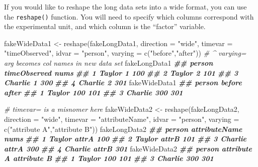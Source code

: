 \documentclass[
  12pt,
  krantz2]{krantz}
\makeatletter
\newenvironment{Shaded}{\begin{snugshade}}{\end{snugshade}}
\newcommand{\AttributeTok}[1]{\textcolor[rgb]{0.61,0.61,0.61}{#1}}
\newcommand{\CommentTok}[1]{\textcolor[rgb]{0.37,0.37,0.37}{\textit{#1}}}
\newcommand{\DocumentationTok}[1]{\textcolor[rgb]{0.37,0.37,0.37}{\textbf{\textit{#1}}}}
\newcommand{\FunctionTok}[1]{\textcolor[rgb]{0,0,0}{#1}}
\newcommand{\NormalTok}[1]{#1}
\newcommand{\OtherTok}[1]{\textcolor[rgb]{0.37,0.37,0.37}{#1}}
\newcommand{\StringTok}[1]{\textcolor[rgb]{0.5,0.5,0.5}{#1}}
\newenvironment{kframe}{%
\medskip{}
\setlength{\fboxsep}{.8em}
 \def\at@end@of@kframe{}%
 \ifinner\ifhmode%
  \def\at@end@of@kframe{\end{minipage}}%
  \begin{minipage}{\columnwidth}%
 \fi\fi%
 \def\FrameCommand##1{\hskip\@totalleftmargin \hskip-\fboxsep
 \colorbox{shadecolor}{##1}\hskip-\fboxsep
     \hskip-\linewidth \hskip-\@totalleftmargin \hskip\columnwidth}%
 \MakeFramed {\advance\hsize-\width
   \@totalleftmargin\z@ \linewidth\hsize
   \@setminipage}}%
 {\par\unskip\endMakeFramed%
 \at@end@of@kframe}
\renewenvironment{Shaded}{\begin{kframe}}{\end{kframe}}
\makeatother
\begin{document}
If you would like to reshape the long data sets into a wide format, you can use the \texttt{reshape()} function. You will need to specify which columns correspond with the experimental unit, and which column is the ``factor'' variable.

\begin{Shaded}
\begin{Highlighting}[]
\NormalTok{fakeWideData1 }\OtherTok{\textless{}{-}} \FunctionTok{reshape}\NormalTok{(fakeLongData1, }
                           \AttributeTok{direction =} \StringTok{"wide"}\NormalTok{, }
                           \AttributeTok{timevar =} \StringTok{"timeObserved"}\NormalTok{, }
                           \AttributeTok{idvar =} \StringTok{"person"}\NormalTok{, }
                           \AttributeTok{varying =} \FunctionTok{c}\NormalTok{(}\StringTok{"before"}\NormalTok{,}\StringTok{"after"}\NormalTok{)) }
\CommentTok{\# \^{} varying= arg becomes col names in new data set}
\NormalTok{fakeLongData1}
\DocumentationTok{\#\#    person timeObserved nums}
\DocumentationTok{\#\# 1  Taylor            1  100}
\DocumentationTok{\#\# 2  Taylor            2  101}
\DocumentationTok{\#\# 3 Charlie            1  300}
\DocumentationTok{\#\# 4 Charlie            2  301}
\NormalTok{fakeWideData1}
\DocumentationTok{\#\#    person before after}
\DocumentationTok{\#\# 1  Taylor    100   101}
\DocumentationTok{\#\# 3 Charlie    300   301}
\end{Highlighting}
\end{Shaded}

\begin{Shaded}
\begin{Highlighting}[]
\CommentTok{\# timevar= is a misnomer here}
\NormalTok{fakeWideData2 }\OtherTok{\textless{}{-}} \FunctionTok{reshape}\NormalTok{(fakeLongData2, }
                           \AttributeTok{direction =} \StringTok{"wide"}\NormalTok{, }
                           \AttributeTok{timevar =} \StringTok{"attributeName"}\NormalTok{, }
                           \AttributeTok{idvar =} \StringTok{"person"}\NormalTok{, }
                           \AttributeTok{varying =} \FunctionTok{c}\NormalTok{(}\StringTok{"attribute A"}\NormalTok{,}\StringTok{"attribute B"}\NormalTok{)) }
\NormalTok{fakeLongData2}
\DocumentationTok{\#\#    person attributeName nums}
\DocumentationTok{\#\# 1  Taylor         attrA  100}
\DocumentationTok{\#\# 2  Taylor         attrB  101}
\DocumentationTok{\#\# 3 Charlie         attrA  300}
\DocumentationTok{\#\# 4 Charlie         attrB  301}
\NormalTok{fakeWideData2}
\DocumentationTok{\#\#    person attribute A attribute B}
\DocumentationTok{\#\# 1  Taylor         100         101}
\DocumentationTok{\#\# 3 Charlie         300         301}
\end{Highlighting}
\end{Shaded}
\end{document}
